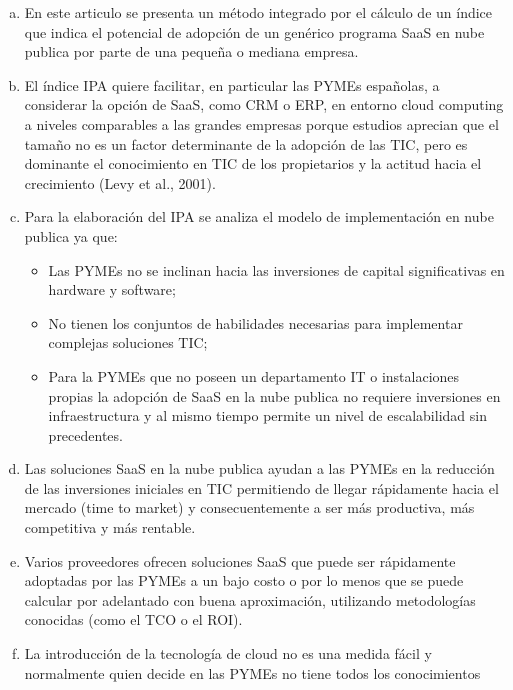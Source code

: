 \begin{enumerate}[a.]
    \item En este articulo se presenta un método integrado por el cálculo de un
          índice que indica el potencial de adopción de un genérico programa SaaS
          en nube publica por parte de una pequeña o mediana empresa.
    \item El índice IPA quiere facilitar, en particular las PYMEs españolas, a
          considerar la opción de SaaS, como CRM o ERP, en entorno cloud computing
          a niveles comparables a las grandes empresas porque estudios aprecian que el
          tamaño no es un factor determinante de la adopción de las TIC, pero es
          dominante el conocimiento en TIC de los propietarios y la actitud hacia
          el crecimiento (Levy et al., 2001).
    \item Para la elaboración del IPA se analiza el modelo de implementación en
          nube publica ya que:
          \begin{itemize}
              \item Las PYMEs no se inclinan hacia las inversiones de capital
                    significativas en hardware y software;
              \item No tienen los conjuntos de habilidades necesarias para implementar
                    complejas soluciones TIC;
              \item Para la PYMEs que no poseen un departamento IT o instalaciones
                    propias la adopción de SaaS en la nube publica no requiere
                    inversiones en infraestructura y al mismo tiempo permite un nivel de
                    escalabilidad sin precedentes.
          \end{itemize}
      \item Las soluciones SaaS en la nube publica ayudan a las PYMEs en la
            reducción de las inversiones iniciales en TIC permitiendo de llegar
            rápidamente hacia el mercado (time to market) y consecuentemente a
            ser más productiva, más competitiva y más rentable.
      \item Varios proveedores ofrecen soluciones SaaS que puede ser rápidamente
            adoptadas por las PYMEs a un bajo costo o por lo menos que se puede
            calcular por adelantado con buena aproximación, utilizando metodologías
            conocidas (como el TCO o el ROI).
      \item La introducción de la tecnología de cloud no es una medida fácil y
            normalmente quien decide en las PYMEs no tiene todos los conocimientos

\end{enumerate}

